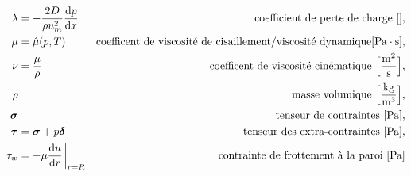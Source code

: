 \begin{align*}
      \lambda &= -\frac{2D}{\rho u_m^2} \dv{p}{x} & \textrm{coefficient de perte de charge } [],\\
      \mu &= \hat{\mu}(p,T) & \textrm{coefficent de viscosité de cisaillement/viscosité dynamique} [\si{Pa \cdot s}],\\
      \nu &= \frac{\mu}{\rho} & \textrm{coefficent de viscosité cinématique } \Big[\si{\frac{m^2}{s}} \Big], \\
      \rho & & \textrm{masse volumique } \Big[\si{\frac{kg}{m^3}}\Big],\\
      \bs{\sigma} & & \textrm{tenseur de contraintes } [\si{Pa} ],\\
      \bs{\tau} &= \bs{\sigma} + p \bs{\delta} & \textrm{tenseur des extra-contraintes } [\si{Pa}],\\
      \tau_w &= -\mu \dv{u}{r}\eval_{r=R} & \textrm{contrainte de frottement à la paroi } [\si{Pa}]
    \end{align*}
  \endgroup
